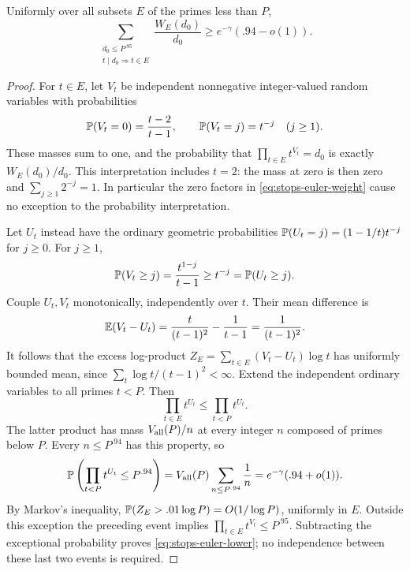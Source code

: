 \begin{lemma}\label{lem:stops-euler-probability}
Uniformly over all subsets $E$ of the primes less than $P$,
\begin{equation}\label{eq:stops-euler-lower}
 \sum_{\substack{d_0\le P^{.95}\\t\mid d_0\Rightarrow t\in E}}
       \frac{W_E(d_0)}{d_0}
 \ge e^{-\gamma}(.94-o(1)).
\end{equation}
\end{lemma}

\begin{proof}
For $t\in E$, let $V_t$ be independent nonnegative integer-valued
random variables with probabilities
\[
 \mathbb P(V_t=0)=\frac{t-2}{t-1},\qquad
 \mathbb P(V_t=j)=t^{-j}\quad(j\ge1).
\]
These masses sum to one, and the probability that
$\prod_{t\in E}t^{V_t}=d_0$ is exactly $W_E(d_0)/d_0$.  This
interpretation includes $t=2$: the mass at zero is then zero and
$\sum_{j\ge1}2^{-j}=1$.  In particular the zero factors in
\eqref{eq:stops-euler-weight} cause no exception to the probability
interpretation.

Let $U_t$ instead have the ordinary geometric probabilities
$\mathbb P(U_t=j)=(1-1/t)t^{-j}$ for $j\ge0$.  For $j\ge1$,
\[
 \mathbb P(V_t\ge j)=\frac{t^{1-j}}{t-1}
 \ge t^{-j}=\mathbb P(U_t\ge j).
\]
Couple $U_t,V_t$ monotonically, independently over $t$.  Their mean
difference is
\[
 \mathbb E(V_t-U_t)
 =\frac{t}{(t-1)^2}-\frac1{t-1}
 =\frac1{(t-1)^2}.
\]
It follows that the excess log-product
$Z_E=\sum_{t\in E}(V_t-U_t)\log t$ has uniformly bounded mean,
since $\sum_t\log t/(t-1)^2<\infty$.  Extend the independent ordinary
variables to all primes $t<P$.  Then
\[
 \prod_{t\in E}t^{U_t}\le\prod_{t<P}t^{U_t}.
\]
The latter product has mass $V_{\rm all}(P)/n$ at every integer $n$
composed of primes below $P$.  Every $n\le P^{.94}$ has this property,
so
\[
 \mathbb P\left(\prod_{t<P}t^{U_t}\le P^{.94}\right)
 =V_{\rm all}(P)\sum_{n\le P^{.94}}\frac1n
 =e^{-\gamma}(.94+o(1)).
\]
By Markov's inequality,
$\mathbb P(Z_E>.01\log P)=O(1/\log P)$, uniformly in $E$.  Outside this
exception the preceding event implies
$\prod_{t\in E}t^{V_t}\le P^{.95}$.  Subtracting the exceptional
probability proves \eqref{eq:stops-euler-lower}; no independence
between these last two events is required.
\end{proof}

